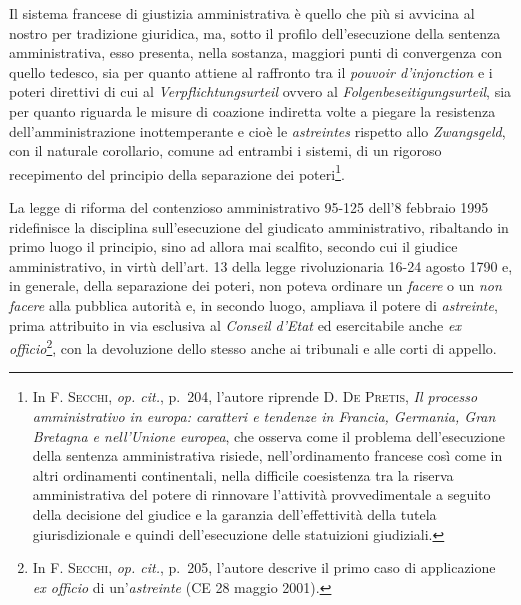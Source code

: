 \documentclass[12pt,it,a4paper,]{report}
\begin{document}
Il sistema francese di giustizia amministrativa è quello che più si
avvicina al nostro per tradizione giuridica, ma, sotto il profilo
dell'esecuzione della sentenza amministrativa, esso presenta, nella
sostanza, maggiori punti di convergenza con quello tedesco, sia per
quanto attiene al raffronto tra il \emph{pouvoir d'injonction} e i
poteri direttivi di cui al \emph{Verpflichtungsurteil} ovvero al
\emph{Folgenbeseitigungsurteil}, sia per quanto riguarda le misure di
coazione indiretta volte a piegare la resistenza dell'amministrazione
inottemperante e cioè le \emph{astreintes} rispetto allo
\emph{Zwangsgeld}, con il naturale corollario, comune ad entrambi i
sistemi, di un rigoroso recepimento del principio della separazione dei
poteri\footnote{In \textsc{F. Secchi}, \emph{op. cit.}, p.~204, l'autore
  riprende D. \textsc{De Pretis}, \emph{Il processo amministrativo in
  europa: caratteri e tendenze in Francia, Germania, Gran Bretagna e
  nell'Unione europea}, che osserva come il problema dell'esecuzione
  della sentenza amministrativa risiede, nell'ordinamento francese così
  come in altri ordinamenti continentali, nella difficile coesistenza
  tra la riserva amministrativa del potere di rinnovare l'attività
  provvedimentale a seguito della decisione del giudice e la garanzia
  dell'effettività della tutela giurisdizionale e quindi dell'esecuzione
  delle statuizioni giudiziali.}.

La legge di riforma del contenzioso amministrativo 95-125 dell'8
febbraio 1995 ridefinisce la disciplina sull'esecuzione del giudicato
amministrativo, ribaltando in primo luogo il principio, sino ad allora
mai scalfito, secondo cui il giudice amministrativo, in virtù dell'art.
13 della legge rivoluzionaria 16-24 agosto 1790 e, in generale, della
separazione dei poteri, non poteva ordinare un \emph{facere} o un
\emph{non facere} alla pubblica autorità e, in secondo luogo, ampliava
il potere di \emph{astreinte}, prima attribuito in via esclusiva al
\emph{Conseil d'Etat} ed esercitabile anche \emph{ex
officio}\footnote{In \textsc{F. Secchi}, \emph{op. cit.}, p.~205,
  l'autore descrive il primo caso di applicazione \emph{ex officio} di
  un'\emph{astreinte} (CE 28 maggio 2001).}, con la devoluzione dello
stesso anche ai tribunali e alle corti di appello.
\end{document}
